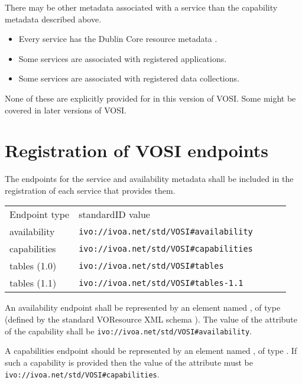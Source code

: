 \documentclass[11pt,letter]{ivoa}
\begin{document}
There may be other metadata associated with a service than the
capability metadata described above.

\begin{itemize}
\item Every service has the Dublin Core resource metadata \citep{std:DUBLINCORE}.
\item Some services are associated with registered applications.
\item Some services are associated with registered data collections. 
\end{itemize}

None of these are explicitly provided for in this version of VOSI. Some
might be covered in later versions of VOSI. 

\section{Registration of VOSI endpoints}
\label{sec:endpoints}

The endpoints for the service and availability metadata shall be
included in the registration of each service that provides them.

\begin{tabular}{l l l l l}
\label{tab:registration}
Endpoint type & standardID value \\
availability & \nolinkurl{ivo://ivoa.net/std/VOSI#availability} \\
capabilities & \nolinkurl{ivo://ivoa.net/std/VOSI#capabilities} \\
tables (1.0) & \nolinkurl{ivo://ivoa.net/std/VOSI#tables} \\
tables (1.1) & \nolinkurl{ivo://ivoa.net/std/VOSI#tables-1.1} \\
\end{tabular}

An availability endpoint shall be represented by an element named
, of type
 (defined by
the standard VOResource XML schema \citet{2018ivoa.spec.0625P}). The
value of the  attribute of the capability shall be
\nolinkurl{ivo://ivoa.net/std/VOSI#availability}.

A capabilities endpoint should be represented by an element named
, of type
. If such a
capability is provided then the value of the 
attribute must be \nolinkurl{ivo://ivoa.net/std/VOSI#capabilities}.
\end{document}
